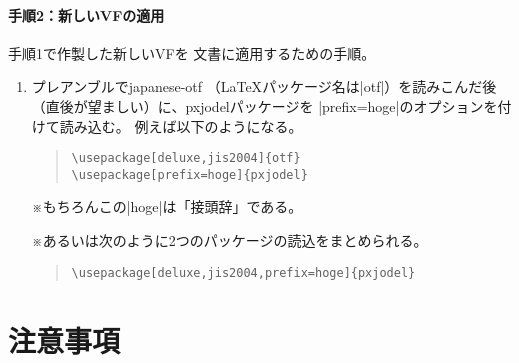 \documentclass[uplatex,dvipdfmx,a4paper]{jsarticle}
\newcommand{\Pkg}[1]{\textsf{#1}}
\newcommand{\Note}{\par\noindent ※}
\begin{document}
\paragraph{手順2：新しいVFの適用}
手順1で作製した新しいVFを
{\pLaTeX}文書に適用するための手順。

\begin{enumerate}
\item プレアンブルで\Pkg{japanese-otf}%
  （{\LaTeX}パッケージ名は|otf|）を読みこんだ後
  （直後が望ましい）に、\Pkg{pxjodel}パッケージを
  |prefix=hoge|のオプションを付けて読み込む。
  例えば以下のようになる。
\begin{quote}\small\begin{verbatim}
\usepackage[deluxe,jis2004]{otf}
\usepackage[prefix=hoge]{pxjodel}
\end{verbatim}\end{quote}
  \Note もちろんこの|hoge|は「接頭辞」である。
  \Note あるいは次のように2つのパッケージの読込をまとめられる。
\begin{quote}\small\begin{verbatim}
\usepackage[deluxe,jis2004,prefix=hoge]{pxjodel}
\end{verbatim}\end{quote}
\end{enumerate}

\section{注意事項}
\label{sec:Notice}
\end{document}
